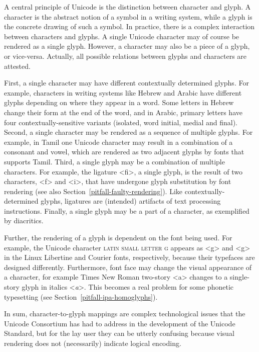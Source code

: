 A central principle of Unicode is the distinction between character and glyph. A
character is the abstract notion of a symbol in a writing system, while a glyph
is the concrete drawing of such a symbol. In practice, there is a complex
interaction between characters and glyphs. A single Unicode character may of
course be rendered as a single glyph. However, a character may also be a piece
of a glyph, or vice-versa. Actually, all possible relations between glyphs and
characters are attested.

First, a single character may have different contextually determined glyphs. For
example, characters in writing systems like Hebrew and Arabic have different
glyphs depending on where they appear in a word. Some letters in Hebrew change
their form at the end of the word, and in Arabic, primary letters have four
contextually-sensitive variants (isolated, word initial, medial and final).
Second, a single character may be rendered as a sequence of multiple glyphs. For
example, in Tamil one Unicode character may result in a combination of a
consonant and vowel, which are rendered as two adjacent glyphs by fonts that
supports Tamil. Third, a single glyph may be a combination of multiple
characters. For example, the ligature <ﬁ>, a single glyph, is the result of two
characters, <f> and <i>, that have undergone glyph substitution by font
rendering (see also Section~\ref{pitfall-faulty-rendering}). Like
contextually-determined glyphs, ligatures are (intended) artifacts of text
processing instructions. Finally, a single glyph may be a part of a
character, as exemplified by diacritics.

Further, the rendering of a glyph is dependent on the font being used. For
example, the Unicode character \textsc{latin small letter g} appears as <g> and
<{g}> in the Linux Libertine and Courier fonts, respectively,
because their typefaces are designed differently. Furthermore, font face may
change the visual appearance of a character, for example Times New Roman
two-story <{a}> changes to a single-story glyph in italics
<\emph{a}>. This becomes a real problem for some
phonetic typesetting (see Section~\ref{pitfall-ipa-homoglyphs}).

In sum, character-to-glyph mappings are complex technological issues that the
Unicode Consortium has had to address in the development of the Unicode
Standard, but for the lay user they can be utterly confusing because visual
rendering does not (necessarily) indicate logical encoding.

